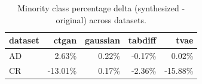 \begin{table}
\centering
\caption{Minority class percentage delta (synthesized - original) across datasets.}
\label{tab:label_balance_delta}
\begin{tabular}{lrrrr}
\toprule
dataset & ctgan & gaussian & tabdiff & tvae \\
\midrule
AD & 2.63\% & 0.22\% & -0.17\% & 0.02\% \\
CR & -13.01\% & 0.17\% & -2.36\% & -15.88\% \\
\bottomrule
\end{tabular}
\end{table}
